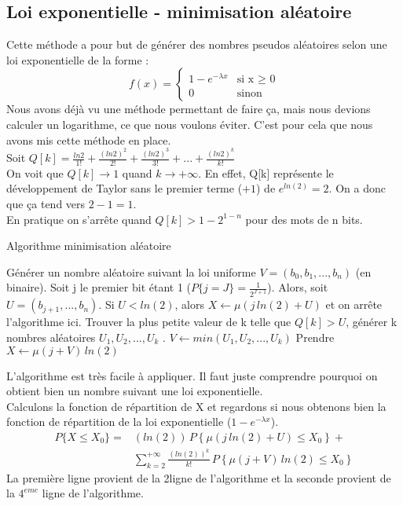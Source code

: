 \subsection{Loi exponentielle - minimisation aléatoire}
Cette méthode a pour but de générer des nombres pseudos aléatoires selon une loi exponentielle de la forme :
\begin{equation}
f(x) = 
\left\lbrace
	\begin{array}{ccc}
   	 1 - e^{-\lambda x} & \text{si x $\geq$ 0}\\ 
   	 0 & \text{sinon}
    \end{array}\right.
\end{equation}
\smallbreak
Nous avons déjà vu une méthode permettant de faire ça, mais nous devions calculer un logarithme, ce que nous voulons éviter. C'est pour cela que nous avons mis cette méthode en place.\\ \smallbreak
Soit $Q[k] = \frac{ln 2}{1!} + \frac{(ln 2)^2}{2!} + \frac{(ln 2)^3}{3!} + ... + \frac{(ln 2)^k}{k!}$\\ \smallbreak
On voit que $ Q[k] \rightarrow 1$ quand $k \rightarrow +\infty$. En effet, Q[k] représente le développement de Taylor sans le premier terme ($ + 1$) de $e^{ln(2)} = 2$. On a donc que ça tend vers $2 - 1 = 1$.\\ \smallbreak
En pratique on s'arrête quand $Q[k] > 1 -2^{1-n}$ pour des mots de n bits.\\ \smallbreak
\begin{algorithm}[H]
	\caption{Algorithme minimisation aléatoire}
	\begin{algorithmic}[1]
		\State Générer un nombre aléatoire suivant la loi uniforme $V = (b_{0}, b_{1}, ..., b_{n})$ (en binaire). Soit j le premier bit étant 1 ($P\{j = J\} = \frac{1}{2^{J+1}}$). Alors, soit $U = (b_{j+1},...,b_{n})$.\smallbreak
		\State Si $U < ln(2)$, alors $X \leftarrow \mu (j\,ln(2) + U)$ et on arrête l'algorithme ici.\smallbreak
		\State Trouver la plus petite valeur de k telle que $Q[k] > U$, générer k nombres aléatoires $U_{1}, U_{2}, ..., U_{k}$ . $V \leftarrow min(U_{1}, U_{2}, ..., U_{k})$\smallbreak
		\State Prendre $X \leftarrow \mu (j + V)\,ln(2)$
	\end{algorithmic}
\end{algorithm} 

L'algorithme est très facile à appliquer. Il faut juste comprendre pourquoi on obtient bien un nombre suivant une loi exponentielle.\\
Calculons la fonction de répartition de X et regardons si nous obtenons bien la fonction de répartition de la loi exponentielle ($1 - e^{-\lambda x}$).\\
\begin{equation}
\begin{split}
	P\{X \leq X_0\} =& (ln(2))\,P\left\{\mu(j\,ln(2) + U) \leq X_0\right\} +\\
	& \sum_{k=2}^{+\infty}\frac{(ln(2))^k}{k!}\,P\left\{\mu(j + V)\,ln(2) \leq X_0\right\}
\end{split}
\end{equation}
\smallbreak
La première ligne provient de la 2\ieme ligne de l'algorithme et la seconde provient de la $4^{eme}$ ligne de l'algorithme.
